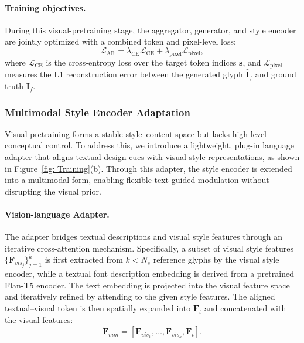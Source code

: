 \paragraph{Training objectives.} During this visual-pretraining stage, the aggregator, generator, and style encoder are jointly optimized with a combined token and pixel-level loss:
\begin{equation}
\mathcal{L}_{\text{AR}} = \lambda_{\text{CE}}\mathcal{L}_{\text{CE}} + \lambda_{\text{pixel}}\mathcal{L}_{\text{pixel}},
\end{equation}
where $\mathcal{L}_{\text{CE}}$ is the cross-entropy loss over the target token indices $\mathbf{s}$, and $\mathcal{L}_{\text{pixel}}$ measures the L1 reconstruction error between the generated glyph $\hat{\mathbf{I}}_f$ and ground truth $\mathbf{I}_f$. 

\subsubsection{Multimodal Style Encoder Adaptation}
Visual pretraining forms a stable style–content space but lacks high-level conceptual control. To address this, we introduce a lightweight, plug-in language adapter that aligns textual design cues with visual style representations, as shown in Figure~\ref{fig: Training}(b). Through this adapter, the style encoder is extended into a multimodal form, enabling flexible text-guided modulation without disrupting the visual prior.
\vspace{-3mm}
\paragraph{Vision-language Adapter.} The adapter bridges textual descriptions and visual style features through an iterative cross-attention mechanism. Specifically, a subset of visual style features $\{\mathbf{F}_{vis_j}\}^{k}_{j=1}$ is first extracted from $k<N_s$ reference glyphs by the visual style encoder, while a textual font description embedding is derived from a pretrained Flan-T5 encoder. The text embedding is projected into the visual feature space and iteratively refined by attending to the given style features. The aligned textual–visual token is then spatially expanded into $\mathbf{F}_t$ and concatenated with the visual features:
\begin{equation}
\tilde{\mathbf{F}}_{mm} = [\mathbf{F}_{vis_1}, \ldots, \mathbf{F}_{vis_k}, \mathbf{F}_t].
\end{equation}
